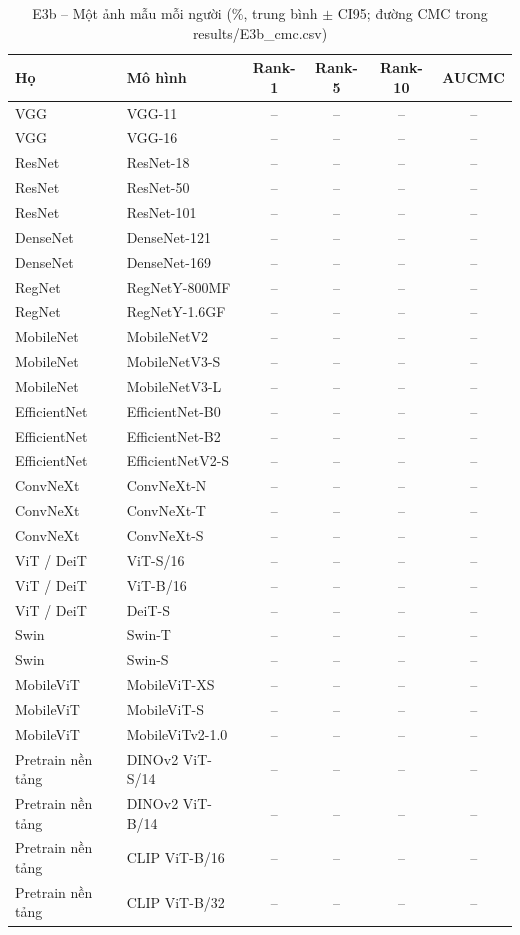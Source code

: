 \begin{table}[t]
\centering
\small
\caption{E3b – Một ảnh mẫu mỗi người (\%, trung bình $\pm$ CI95; đường CMC trong results/E3b\_cmc.csv)}
\begin{tabular}{llcccc}
\toprule
Họ & Mô hình & Rank-1 & Rank-5 & Rank-10 & AUCMC \\
\midrule
VGG & VGG-11 & – & – & – & – \\
VGG & VGG-16 & – & – & – & – \\
ResNet & ResNet-18 & – & – & – & – \\
ResNet & ResNet-50 & – & – & – & – \\
ResNet & ResNet-101 & – & – & – & – \\
DenseNet & DenseNet-121 & – & – & – & – \\
DenseNet & DenseNet-169 & – & – & – & – \\
RegNet & RegNetY-800MF & – & – & – & – \\
RegNet & RegNetY-1.6GF & – & – & – & – \\
MobileNet & MobileNetV2 & – & – & – & – \\
MobileNet & MobileNetV3-S & – & – & – & – \\
MobileNet & MobileNetV3-L & – & – & – & – \\
EfficientNet & EfficientNet-B0 & – & – & – & – \\
EfficientNet & EfficientNet-B2 & – & – & – & – \\
EfficientNet & EfficientNetV2-S & – & – & – & – \\
ConvNeXt & ConvNeXt-N & – & – & – & – \\
ConvNeXt & ConvNeXt-T & – & – & – & – \\
ConvNeXt & ConvNeXt-S & – & – & – & – \\
ViT / DeiT & ViT-S/16 & – & – & – & – \\
ViT / DeiT & ViT-B/16 & – & – & – & – \\
ViT / DeiT & DeiT-S & – & – & – & – \\
Swin & Swin-T & – & – & – & – \\
Swin & Swin-S & – & – & – & – \\
MobileViT & MobileViT-XS & – & – & – & – \\
MobileViT & MobileViT-S & – & – & – & – \\
MobileViT & MobileViTv2-1.0 & – & – & – & – \\
Pretrain nền tảng & DINOv2 ViT-S/14 & – & – & – & – \\
Pretrain nền tảng & DINOv2 ViT-B/14 & – & – & – & – \\
Pretrain nền tảng & CLIP ViT-B/16 & – & – & – & – \\
Pretrain nền tảng & CLIP ViT-B/32 & – & – & – & – \\
\bottomrule
\end{tabular}
\end{table}
